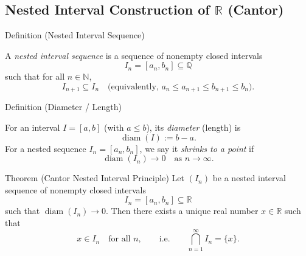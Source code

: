 
\subsection{\texorpdfstring{Nested Interval Construction of $\mathbb{R}$ (Cantor)}{Nested Interval Construction of R (Cantor)}}
\label{sec:reals-nested-intervals}


\begin{definitionbox}{Definition (Nested Interval Sequence)}
\begin{definition}\label{def:nested-intervals}
A \emph{nested interval sequence} is a sequence of nonempty closed intervals
\[
I_n = [a_n,b_n] \subseteq \mathbb{Q}
\]
such that for all $n\in\mathbb{N}$,
\[
I_{n+1}\subseteq I_n
\quad\text{(equivalently, } a_n \le a_{n+1} \le b_{n+1} \le b_n\text{).}
\]
\end{definition}
\end{definitionbox}

\begin{definitionbox}{Definition (Diameter / Length)}
\begin{definition}\label{def:diameter}
For an interval $I=[a,b]$ (with $a\le b$), its \emph{diameter} (length) is
\[
\operatorname{diam}(I) := b-a.
\]
For a nested sequence $I_n=[a_n,b_n]$, we say it \emph{shrinks to a point} if
\[
\operatorname{diam}(I_n) \longrightarrow 0 \quad \text{as } n\to\infty.
\]
\end{definition}
\end{definitionbox}

\begin{theorembox}{Theorem (Cantor Nested Interval Principle)}
\label{thm:cantor-nested}
Let $(I_n)$ be a nested interval sequence of nonempty closed intervals
\[
I_n=[a_n,b_n] \subseteq \mathbb{R}
\]
such that $\operatorname{diam}(I_n)\to 0$.
Then there exists a unique real number $x\in\mathbb{R}$ such that
\[
x\in I_n \quad\text{for all } n,
\qquad\text{i.e.}\qquad
\bigcap_{n=1}^\infty I_n = \{x\}.
\]
\end{theorembox}


